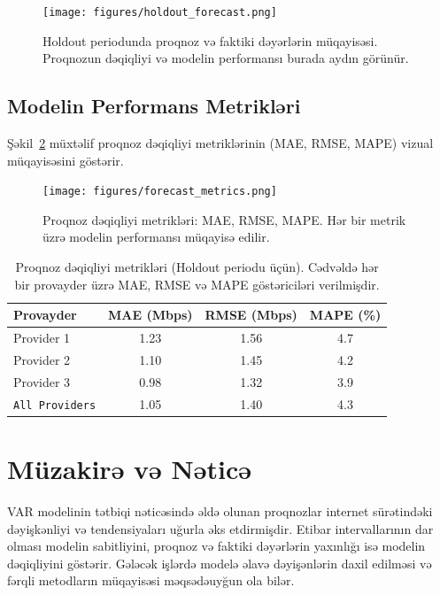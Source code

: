 \documentclass[12pt,a4paper]{article}
\begin{document}
\begin{figure}[h!]
    \centering
    \texttt{[image: figures/holdout\_forecast.png]}
    \caption{Holdout periodunda proqnoz və faktiki dəyərlərin müqayisəsi. Proqnozun dəqiqliyi və modelin performansı burada aydın görünür.}
    \label{fig:holdout_forecast}
\end{figure}

\subsection{Modelin Performans Metrikləri}
Şəkil~\ref{fig:metrics} müxtəlif proqnoz dəqiqliyi metriklərinin (MAE, RMSE, MAPE) vizual müqayisəsini göstərir.

\begin{figure}[h!]
    \centering
    \texttt{[image: figures/forecast\_metrics.png]}
    \caption{Proqnoz dəqiqliyi metrikləri: MAE, RMSE, MAPE. Hər bir metrik üzrə modelin performansı müqayisə edilir.}
    \label{fig:metrics}
\end{figure}

\begin{table}[h!]
    \centering
    \caption{Proqnoz dəqiqliyi metrikləri (Holdout periodu üçün). Cədvəldə hər bir provayder üzrə MAE, RMSE və MAPE göstəriciləri verilmişdir.}
    \label{tab:metrics}
    \begin{tabular}{lccc}
        \hline
        Provayder & MAE (Mbps) & RMSE (Mbps) & MAPE (\%) \\
        \hline
        Provider 1 & 1.23 & 1.56 & 4.7 \\
        Provider 2 & 1.10 & 1.45 & 4.2 \\
        Provider 3 & 0.98 & 1.32 & 3.9 \\
        \texttt{All Providers} & 1.05 & 1.40 & 4.3 \\
        \hline
    \end{tabular}
\end{table}

\section{Müzakirə və Nəticə}
VAR modelinin tətbiqi nəticəsində əldə olunan proqnozlar internet sürətindəki dəyişkənliyi və tendensiyaları uğurla əks etdirmişdir. Etibar intervallarının dar olması modelin sabitliyini, proqnoz və faktiki dəyərlərin yaxınlığı isə modelin dəqiqliyini göstərir. Gələcək işlərdə modelə əlavə dəyişənlərin daxil edilməsi və fərqli metodların müqayisəsi məqsədəuyğun ola bilər.
\end{document}
